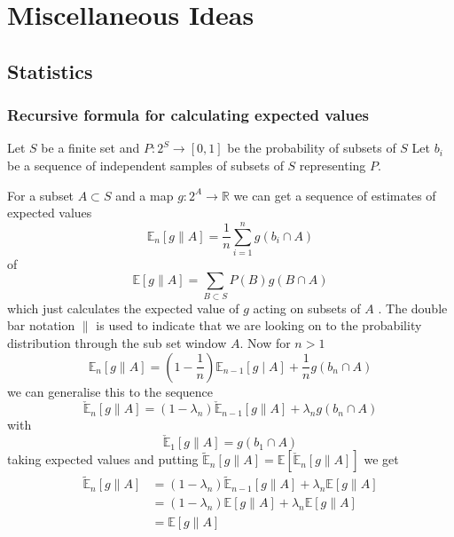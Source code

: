 \documentclass[a4paper,oneside,english]{book}
\numberwithin{equation}{section}
\numberwithin{figure}{section}
\begin{document}
\part{Miscellaneous Ideas}
\chapter{Statistics}
\section{Recursive formula for calculating expected values}

Let $S$ be a finite set and $P:2^S \longrightarrow [0,1]$ be the probability of subsets of $S$
Let $b_{i}$ be a sequence of independent samples of subsets of $S$ 
representing $P$. 

For a subset $A\subset S$ and a map $g:2^{A}\rightarrow\mathbb{R}$
we can get a sequence of estimates of expected values
\[
\mathbb{E}_{n}[g\parallel A]=\frac{1}{n}\sum_{i=1}^{n}g(b_{i}\cap A)
\]
of 
\[
\mathbb{E}[g\parallel A]=\sum_{B\subset S}P(B)g(B\cap A)
\]
which just calculates the expected value of $g$ acting on subsets
of $A$ . The double bar notation $\parallel$ is used to indicate
that we are looking on to the probability distribution through the
sub set window $A$. Now for $n>1$ 
\[
\mathbb{E}_{n}[g\parallel A]=\left(1-\frac{1}{n}\right)\mathbb{E}_{n-1}[g\mid A]+\frac{1}{n}g(b_{n}\cap A)
\]
we can generalise this to the sequence 
\[
\check{\mathbb{E}}_{n}[g\parallel A]=\left(1-\lambda_{n}\right)\mathbb{\check{E}}_{n-1}[g\parallel A]+\lambda_{n}g(b_{n}\cap A)
\]
with 
\[
\check{\mathbb{E}}_{1}[g\parallel A]=g(b_{1}\cap A)
\]
taking expected values and putting $\mathbb{\tilde{E}}_{n}[g\parallel A]=\mathbb{E}\left[\check{\mathbb{E}}_{n}[g\parallel A]\right]$
we get
\begin{align}
\mathbb{\tilde{E}}_{n}[g\parallel A] & = (1-\lambda_{n})\mathbb{\tilde{E}}_{n-1}[g\parallel A]+\lambda_{n}\mathbb{E}[g\parallel A]\\
& = (1-\lambda_{n})\mathbb{\mathbb{E}}[g\parallel A]+\lambda_{n}\mathbb{E}[g\parallel A]\\
& = \mathbb{E}[g\parallel A]
\end{align}
\end{document}

